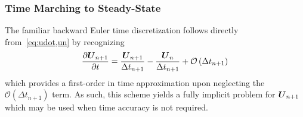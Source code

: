 \subsubsection{Time Marching to Steady-State}
The familiar backward Euler time discretization follows directly from~\eqref{eq:udot,un} by recognizing
\begin{equation}
  {\frac{\partial{{\boldsymbol{U}}_{n+1}}}{\partial{t}}} = \frac{{\boldsymbol{U}}_{n+1}}{\Delta t_{n+1}} - \frac{{\boldsymbol{U}}_n}{\Delta t_{n+1}} + \mathcal{O}\left(\Delta t_{n+1}\right)
  \label{eq:udot_backward_euler}
\end{equation}
which provides a first-order in time approximation upon neglecting the $\mathcal{O}\left(\Delta t_{n+1}\right)$ term.  As such, this scheme yields a fully implicit problem for ${\boldsymbol{U}}_{n+1}$ which may be used when time accuracy is not required.  

